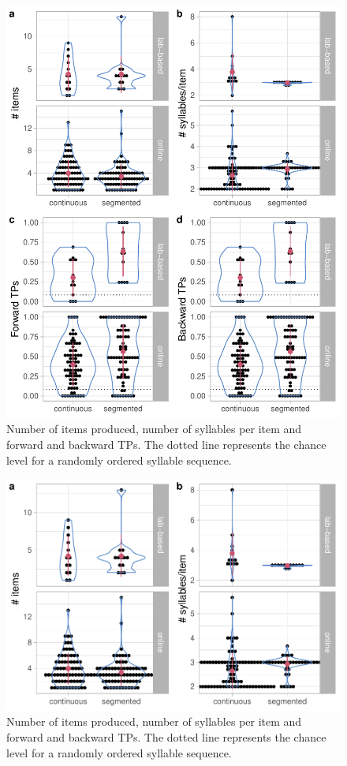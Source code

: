 \documentclass[
]{article}
\begin{document}
\begin{figure}

{\centering \includegraphics[width=0.8\linewidth]{segmentation_recall_combined_for_revision_files/figure-latex/recall-general-measures-tp-plot-1} 

}

\caption{Number of items produced, number of syllables per item and forward and backward TPs. The dotted line represents the chance level for a randomly ordered syllable sequence.}\label{fig:recall-general-measures-tp-plot}
\end{figure}

\begin{figure}

{\centering \includegraphics[width=0.8\linewidth]{segmentation_recall_combined_for_revision_files/figure-latex/recall-general-measures-tp-plot-n-items-sylls-1} 

}

\caption{Number of items produced, number of syllables per item and forward and backward TPs. The dotted line represents the chance level for a randomly ordered syllable sequence.}\label{fig:recall-general-measures-tp-plot-n-items-sylls}
\end{figure}
\end{document}
